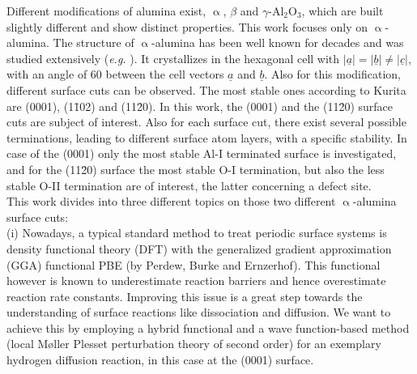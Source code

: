 \documentclass[11pt,DIV=13,BCOR=5mm,a4paper,headinclude]{scrbook}
\renewcommand{\vec}[1]{\underline{#1}}
\begin{document}
Different modifications of alumina exist, $\upalpha$, $\beta$ and $\gamma$-Al$_2$O$_3$, which are built slightly different and show distinct properties.
This work focuses only on $\upalpha$-alumina.
The structure of $\upalpha$-alumina has been well known for decades and was studied extensively (\textit{e.g.} \cite{Passerini1930,wyckoff1931}).
It crystallizes in the hexagonal cell with $|\vec{a}|=|\vec{b}|\neq |\vec{c}|$, with an angle of $60$\textdegree{} between the cell vectors $\vec{a}$ and $\vec{b}$.
Also for this modification, different surface cuts can be observed. 
The most stable ones according to Kurita\cite{kuri10} are (0001), (1\=102) and (11\=20).
In this work, the (0001) and the (11\=20) surface cuts are subject of interest.
Also for each surface cut, there exist several possible terminations, leading to different surface atom layers, with a specific stability.
In case of the (0001) only the most stable Al-I terminated surface is investigated, and for the (11\=20) surface the most stable O-I termination, but also the less stable O-II termination are of interest, the latter concerning a defect site.
\\

This work divides into three different topics on those two different $\upalpha$-alumina surface cuts:\\
(i) Nowadays, a typical standard method to treat periodic surface systems is density functional theory (DFT) with the generalized gradient approximation (GGA) functional PBE (by Perdew, Burke and Ernzerhof).
This functional however is known to underestimate reaction barriers and hence overestimate reaction rate constants.
Improving this issue is a great step towards the understanding of surface reactions like dissociation and diffusion.
We want to achieve this by employing a hybrid functional and a wave function-based method (local M\o{}ller Plesset perturbation theory of second order) for an exemplary hydrogen diffusion reaction, in this case at the (0001) surface.
\end{document}
